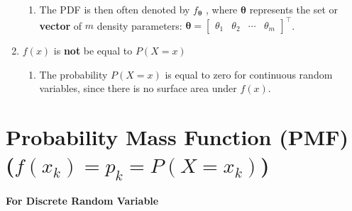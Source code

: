 \begin{enumerate}
\begin{enumerate}
        \item The PDF is then often denoted by $f_{\bm{\theta}}$ , where $\bm{\theta}$ represents the set or \textbf{vector} of $m$ density parameters:
        $\bm{\theta} =
        \begin{bmatrix}
            \theta_1 & \theta_2 & \cdots &\theta_m
        \end{bmatrix}
        ^\top
        $.
        \hfill \cite{statistics/book/Statistics-for-Data-Scientists/Maurits-Kaptein}
    \end{enumerate}

    \item  $f(x)$ is \textbf{not} be equal to $P(X = x)$
    \hfill \cite{statistics/book/Statistics-for-Data-Scientists/Maurits-Kaptein}
    \begin{enumerate}
        \item The probability $P(X = x)$ is equal to zero for continuous random variables, since there is no surface area under $f (x)$.
        \hfill \cite{statistics/book/Statistics-for-Data-Scientists/Maurits-Kaptein}
    \end{enumerate}
\end{enumerate}





\section{Probability Mass Function (PMF) ($f(x_k) = p_k = P(X = x_k)$)}

\textbf{For Discrete Random Variable}

